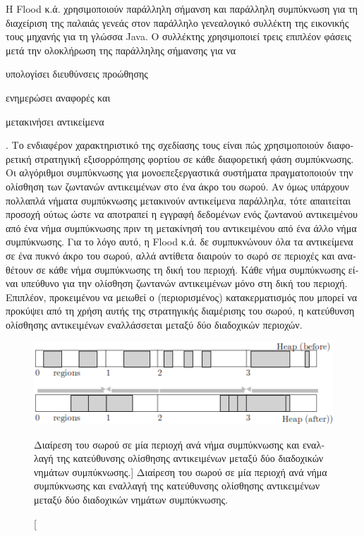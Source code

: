 \begin{greek}
Η Flood κ.ά. \cite{DBLP:conf/jvm/FloodDSZ01} χρησιμοποιούν παράλληλη
σήμανση και παράλληλη συμπύκνωση για τη διαχείριση της παλαιάς
γενεάς στον παράλληλο γενεαλογικό συλλέκτη της εικονικής τους
μηχανής για τη γλώσσα Java. Ο συλλέκτης χρησιμοποιεί τρεις επιπλέον
φάσεις μετά την ολοκλήρωση της παράλληλης σήμανσης για να
\begin{inparaenum}[(i)]
  \item υπολογίσει διευθύνσεις προώθησης
  \item ενημερώσει αναφορές και
  \item μετακινήσει αντικείμενα
\end{inparaenum}. Το ενδιαφέρον χαρακτηριστικό της σχεδίασης
τους είναι πώς χρησιμοποιούν διαφορετική στρατηγική εξισορρόπησης
φορτίου σε κάθε διαφορετική φάση συμπύκνωσης. Οι αλγόριθμοι
συμπύκνωσης για μονοεπεξεργαστικά συστήματα πραγματοποιούν την
ολίσθηση των ζωντανών αντικειμένων στο ένα άκρο του σωρού.
Αν όμως υπάρχουν πολλαπλά νήματα συμπύκνωσης μετακινούν αντικείμενα
παράλληλα, τότε απαιτείται προσοχή ούτως ώστε να αποτραπεί η
εγγραφή δεδομένων ενός ζωντανού αντικειμένου από ένα νήμα
συμπύκνωσης πριν τη μετακίνησή του αντικειμένου από ένα άλλο
νήμα συμπύκνωσης. Για το λόγο αυτό, η Flood κ.ά. δε συμπυκνώνουν
όλα τα αντικείμενα σε ένα πυκνό άκρο του σωρού, αλλά αντίθετα
διαιρούν το σωρό σε περιοχές και αναθέτουν σε κάθε νήμα συμπύκνωσης
τη δική του περιοχή. Κάθε νήμα συμπύκνωσης είναι υπεύθυνο για
την ολίσθηση ζωντανών αντικειμένων μόνο στη δική του περιοχή.
Επιπλέον, προκειμένου να μειωθεί ο (περιορισμένος) κατακερματισμός
που μπορεί να προκύψει από τη χρήση αυτής της στρατηγικής
διαμέρισης του σωρού, η κατεύθυνση ολίσθησης αντικειμένων
εναλλάσσεται μεταξύ δύο διαδοχικών περιοχών. 

\begin{figure}
  \centering
  \includegraphics{figures/par_5}
  \caption
    [Διαίρεση του σωρού σε μία περιοχή ανά νήμα συμπύκνωσης
     και εναλλαγή της κατεύθυνσης ολίσθησης αντικειμένων μεταξύ
     δύο διαδοχικών νημάτων συμπύκνωσης.]
    {Διαίρεση του σωρού σε μία περιοχή ανά νήμα συμπύκνωσης
     και εναλλαγή της κατεύθυνσης ολίσθησης αντικειμένων μεταξύ
     δύο διαδοχικών νημάτων συμπύκνωσης.}
  \label{fig:par_5}
\end{figure}


\end{greek}
